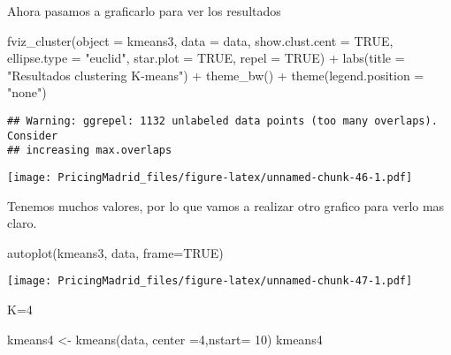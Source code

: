 \documentclass[
]{article}
\newenvironment{Shaded}{\begin{snugshade}}{\end{snugshade}}
\newcommand{\AttributeTok}[1]{\textcolor[rgb]{0.77,0.63,0.00}{#1}}
\newcommand{\ConstantTok}[1]{\textcolor[rgb]{0.00,0.00,0.00}{#1}}
\newcommand{\DecValTok}[1]{\textcolor[rgb]{0.00,0.00,0.81}{#1}}
\newcommand{\FunctionTok}[1]{\textcolor[rgb]{0.00,0.00,0.00}{#1}}
\newcommand{\NormalTok}[1]{#1}
\newcommand{\OtherTok}[1]{\textcolor[rgb]{0.56,0.35,0.01}{#1}}
\newcommand{\SpecialCharTok}[1]{\textcolor[rgb]{0.00,0.00,0.00}{#1}}
\newcommand{\StringTok}[1]{\textcolor[rgb]{0.31,0.60,0.02}{#1}}
\begin{document}
Ahora pasamos a graficarlo para ver los resultados

\begin{Shaded}
\begin{Highlighting}[]
\FunctionTok{fviz\_cluster}\NormalTok{(}\AttributeTok{object =}\NormalTok{ kmeans3, }\AttributeTok{data =}\NormalTok{ data, }\AttributeTok{show.clust.cent =} \ConstantTok{TRUE}\NormalTok{,}
             \AttributeTok{ellipse.type =} \StringTok{"euclid"}\NormalTok{, }\AttributeTok{star.plot =} \ConstantTok{TRUE}\NormalTok{, }\AttributeTok{repel =} \ConstantTok{TRUE}\NormalTok{) }\SpecialCharTok{+}
  \FunctionTok{labs}\NormalTok{(}\AttributeTok{title =} \StringTok{"Resultados clustering K{-}means"}\NormalTok{) }\SpecialCharTok{+}
  \FunctionTok{theme\_bw}\NormalTok{() }\SpecialCharTok{+}
  \FunctionTok{theme}\NormalTok{(}\AttributeTok{legend.position =} \StringTok{"none"}\NormalTok{)}
\end{Highlighting}
\end{Shaded}

\begin{verbatim}
## Warning: ggrepel: 1132 unlabeled data points (too many overlaps). Consider
## increasing max.overlaps
\end{verbatim}

\texttt{[image: PricingMadrid\_files/figure-latex/unnamed-chunk-46-1.pdf]}

Tenemos muchos valores, por lo que vamos a realizar otro grafico para
verlo mas claro.

\begin{Shaded}
\begin{Highlighting}[]
\FunctionTok{autoplot}\NormalTok{(kmeans3, data, }\AttributeTok{frame=}\ConstantTok{TRUE}\NormalTok{)}
\end{Highlighting}
\end{Shaded}

\texttt{[image: PricingMadrid\_files/figure-latex/unnamed-chunk-47-1.pdf]}

K=4

\begin{Shaded}
\begin{Highlighting}[]
\NormalTok{kmeans4 }\OtherTok{\textless{}{-}} \FunctionTok{kmeans}\NormalTok{(data, }\AttributeTok{center =}\DecValTok{4}\NormalTok{,}\AttributeTok{nstart=} \DecValTok{10}\NormalTok{)}
\NormalTok{kmeans4}
\end{Highlighting}
\end{Shaded}
\end{document}
